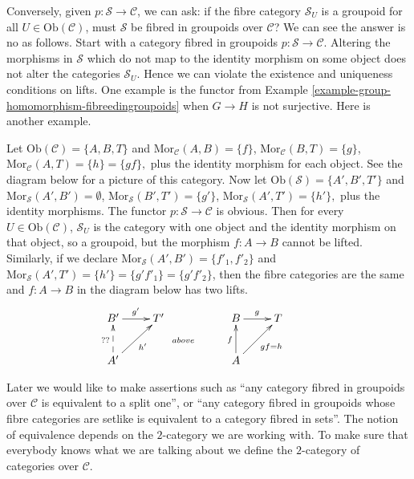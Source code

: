 \noindent
Conversely, given $p : \mathcal{S} \to \mathcal{C}$, we can ask: if the fibre
category $\mathcal{S}_U$ is a groupoid for all $U \in \text{Ob}(\mathcal{C})$,
must $\mathcal{S}$ be fibred in groupoids over $\mathcal{C}$? We can see the
answer is no as follows. Start with a category fibred in groupoids
$p : \mathcal{S} \to \mathcal{C}$. Altering the morphisms in $\mathcal{S}$
which do not map to the identity morphism on some object does not alter the 
categories $\mathcal{S}_U$. Hence we can violate the existence and uniqueness
conditions on lifts. One example is the functor from Example 
\ref{example-group-homomorphism-fibreedingroupoids} when $G \to H$ is not
surjective. Here is another example.

\begin{example}
Let $ \text{Ob}(\mathcal{C}) = \{A,B,T\}$ and 
$\text{Mor}_\mathcal{C}(A,B) = \{f\}$, $\text{Mor}_\mathcal{C}(B,T) = \{g\}$,
$\text{Mor}_\mathcal{C}(A,T) = \{h\} = \{gf\},$ plus the identity morphism for 
each object. See the diagram below for a picture of this category. Now let 
$\text{Ob}(\mathcal{S}) = \{A',B',T'\}$ and 
$\text{Mor}_\mathcal{S}(A',B') = \emptyset$,  
$\text{Mor}_\mathcal{S}(B',T') = \{g'\}$,  
$\text{Mor}_\mathcal{S}(A',T') = \{h'\},$ plus the identity morphisms. The 
functor $p : \mathcal{S} \to \mathcal{C}$ is obvious. Then for every 
$U \in \text{Ob}(\mathcal{C})$, $\mathcal{S}_U$ is the category with one 
object and the identity morphism on that object, so a groupoid, but the 
morphism $f: A \to B$ cannot be lifted. Similarly, if we declare 
$\text{Mor}_\mathcal{S}(A',B') = \{f'_1, f'_2\}$ and 
$ \text{Mor}_\mathcal{S}(A',T') = \{h'\} = \{g'f'_1 \} = \{g'f'_2\}$, then 
the fibre categories are the same and $f: A \to B$ in the diagram below has 
two lifts. 
$$
\xymatrix{
B' \ar[r]^{g'} & T' &  & B \ar[r]^g & T & \\
A' \ar@{-->}[u]^{??} \ar[ru]_{h'} & & \ar@{}[u]^{above} &
A \ar[u]^f \ar[ru]_{gf = h} & \\
}
$$ 
\end{example}

\noindent
Later we would like to make assertions such as ``any category fibred in
groupoids over $\mathcal{C}$ is equivalent to a split one'', or
``any category fibred in groupoids whose fibre categories are setlike
is equivalent to a category fibred in sets''. The notion of equivalence
depends on the $2$-category we are working with. To make sure
that everybody knows what we are talking about we define the
$2$-category of categories over $\mathcal{C}$.

